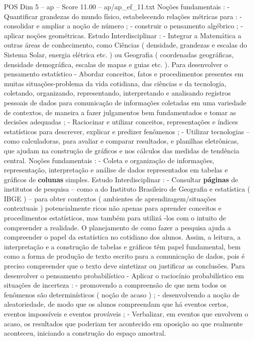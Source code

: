 \begin{textsample}{POS Dim 5 – ap – Score 11.00 – ap/ap\_ef\_11.txt}
Noções fundamentais : - Quantificar grandezas do mundo físico, estabelecendo relações métricas para : - consolidar e ampliar a noção de número ; - construir o pensamento algébrico ; - aplicar noções geométricas.
Estudo Interdisciplinar : - Integrar a Matemática a outras áreas de conhecimento, como Ciências ( densidade, grandezas e escalas do Sistema Solar, energia elétrica etc. ) ou Geografia ( coordenadas geográficas, densidade demográfica, escalas de mapas e guias etc. ).
Para desenvolver o pensamento estatístico - Abordar conceitos, fatos e procedimentos presentes em muitas situações-problema da vida cotidiana, das ciências e da tecnologia, coletando, organizando, representando, interpretando e analisando registros pessoais de dados para comunicação de informações coletadas em uma variedade de contextos, de maneira a fazer julgamentos bem fundamentados e tomar as decisões adequadas ; - Raciocinar e utilizar conceitos, representações e índices estatísticos para descrever, explicar e predizer fenômenos ; - Utilizar tecnologias – como calculadoras, para avaliar e comparar resultados, e planilhas eletrônicas, que ajudam na construção de gráficos e nos cálculos das medidas de tendência central.
Noções fundamentais : - Coleta e organização de informações, representação, interpretação e análise de dados representados em tabelas e gráficos de \textbf{colunas} simples.
Estudo Interdisciplinar : - Consultar \textbf{páginas} de institutos de pesquisa – como a do Instituto Brasileiro de Geografia e estatística ( IBGE ) – para obter contextos ( ambientes de aprendizagem/situações contextuais ) potencialmente ricos não apenas para aprender conceitos e procedimentos estatísticos, mas também para utilizá -los com o intuito de compreender a realidade.
O planejamento de como fazer a pesquisa ajuda a compreender o papel da estatística no cotidiano dos alunos.
Assim, a leitura, a interpretação e a construção de tabelas e gráficos têm papel fundamental, bem como a forma de produção de texto escrito para a comunicação de dados, pois é preciso compreender que o texto deve sintetizar ou justificar as conclusões.
Para desenvolver o pensamento probabilístico - Aplicar o raciocínio probabilístico em situações de incerteza : - promovendo a compreensão de que nem todos os fenômenos são determinísticos ( noção de acaso ) ; - desenvolvendo a noção de aleatoriedade, de modo que os alunos compreendam que há eventos certos, eventos impossíveis e eventos prováveis ; - Verbalizar, em eventos que envolvem o acaso, os resultados que poderiam ter acontecido em oposição ao que realmente aconteceu, iniciando a construção do espaço amostral.

\end{textsample}
